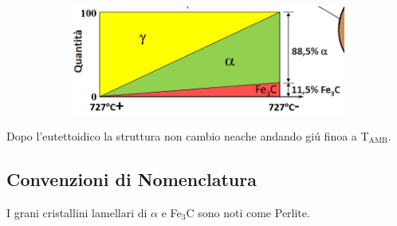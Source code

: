 \documentclass{article}
\begin{document}
{\begin{figure}[h!]
\begin{subfigure}{.45\linewidth}
                \end{subfigure}
                \begin{subfigure}{.45\linewidth}
                    \includegraphics[width=\linewidth]{L12 - Diagramma Fe-C - 0,77C - Cambio fasi.png}
                \end{subfigure}
            \end{figure}
            Dopo l'eutettoidico la struttura non cambio neache andando gi\'u finoa a T$_\text{AMB}$.
        \subsection{Convenzioni di Nomenclatura}
            I grani cristallini lamellari di $\alpha$ e Fe$_3$C sono noti come Perlite.
        \newpage
}
\end{document}
